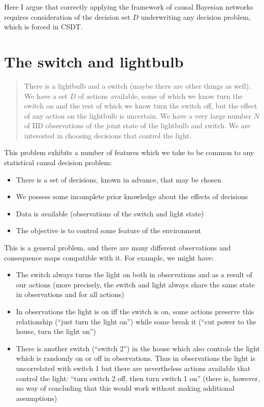 

Here I argue that correctly applying the framework of causal Bayesian networks requires consideration of the decision set $D$ underwriting any decision problem, which is forced in CSDT.

\section{The switch and lightbulb}

\begin{quote}
	There is a lightbulb and a switch (maybe there are other things as well). We have a set $D$ of actions available, some of which we know turn the switch on and the rest of which we know turn the switch off, but the effect of any action on the lightbulb is uncertain. We have a very large number $N$ of IID observations of the joint state of the lightbulb and switch. We are interested in choosing decisions that control the light.
\end{quote}

This problem exhibits a number of features which we take to be common to any statistical causal decision problem:
\begin{itemize}
	\item There is a set of decisions, known in advance, that may be chosen
	\item We possess some incomplete prior knowledge about the effects of decisions
	\item Data is available (observations of the switch and light state)
	\item The objective is to control some feature of the environment
\end{itemize}

This is a general problem, and there are many different observations and consequence maps compatible with it. For example, we might have:
\begin{itemize}
	\item The switch always turns the light on both in observations and as a result of our actions (more precisely, the switch and light always share the same state in observations and for all actions)
	\item In observations the light is on iff the switch is on, some actions preserve this relationship (``just turn the light on'') while some break it (``cut power to the house, turn the light on'')
	\item There is another switch (``switch 2'') in the house which also controls the light which is randomly on or off in observations. Thus in observations the light is uncorrelated with switch 1 but there are nevertheless actions available that control the light: ``turn switch 2 off, then turn switch 1 on'' (there is, however, no way of concluding that this would work without making additional assumptions)
\end{itemize}

